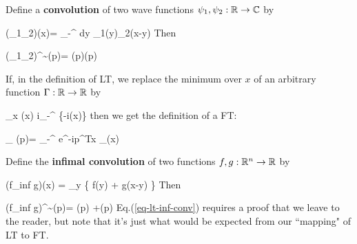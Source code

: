 Define a {\bf convolution}
of two 
wave functions $\psi_1, 
\psi_2:{ \mathbb{R}}\rightarrow { \mathbb{C}}$
by


\beq
(\psi_1\circledast\psi_2)(x)=
\int_{-\infty}^{\infty}
dy\;
\psi_1(y)\psi_2(x-y)
\eeq
Then

\beq
(\psi_1\circledast\psi_2)^\sim(p)=
(p)(p)
\eeq

If, in the definition
of LT,
we replace the minimum
over $x$ of
an arbitrary function $\Gamma:{ \mathbb{R}}\rightarrow { \mathbb{R}}$
by

\beq
\min_x \Gamma(x)\rarrow
i\ln\int_{-\infty}^{\infty}
\exp\{-i\Gamma(x)\}
\eeq
then we get the
definition
of a FT:

\beq
{}_
{\TIL{\psi}(p)}=
\int_{-\infty}^{\infty}
\;
e^{-ip^Tx} 
_{\psi(x)}
\eeq

Define the
{\bf infimal convolution}
of two functions
$f,g:{ \mathbb{R}}^n\rightarrow { \mathbb{R}}$ by

\beq
(f\circledast_{inf} g)(x)
=
\min_y \left\{
f(y) + g(x-y)
\right\}
\eeq
Then

\beq
(f\circledast_{inf} g)^\sim(p)=
(p) +(p)
\label{eq-lt-inf-conv}
\eeq
Eq.(\ref{eq-lt-inf-conv}) requires
a proof that we leave to the reader,
but note that it's just
what would be expected 
from our ``mapping" of 
LT to FT.








